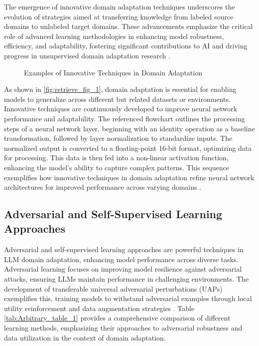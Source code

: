 The emergence of innovative domain adaptation techniques underscores the evolution of strategies aimed at transferring knowledge from labeled source domains to unlabeled target domains. These advancements emphasize the critical role of advanced learning methodologies in enhancing model robustness, efficiency, and adaptability, fostering significant contributions to AI and driving progress in unsupervised domain adaptation research \cite{park2023domainadaptationbasedhuman,zhao2017multiplesourcedomainadaptation}.

\begin{figure}[ht!]
\centering
{}\hspace{0.03\textwidth}
\caption{Examples of Innovative Techniques in Domain Adaptation}\label{fig:retrieve_fig_1}
\end{figure}

As shown in \autoref{fig:retrieve_fig_1}, domain adaptation is essential for enabling models to generalize across different but related datasets or environments. Innovative techniques are continuously developed to improve neural network performance and adaptability. The referenced flowchart outlines the processing steps of a neural network layer, beginning with an identity operation as a baseline transformation, followed by layer normalization to standardize inputs. The normalized output is converted to a floating-point 16-bit format, optimizing data for processing. This data is then fed into a non-linear activation function, enhancing the model's ability to capture complex patterns. This sequence exemplifies how innovative techniques in domain adaptation refine neural network architectures for improved performance across varying domains \cite{ramesh2021zero}.


\subsection{Adversarial and Self-Supervised Learning Approaches} \label{subsec:Adversarial and Self-Supervised Learning Approaches}



Adversarial and self-supervised learning approaches are powerful techniques in LLM domain adaptation, enhancing model performance across diverse tasks. Adversarial learning focuses on improving model resilience against adversarial attacks, ensuring LLMs maintain performance in challenging environments. The development of transferable universal adversarial perturbations (UAPs) exemplifies this, training models to withstand adversarial examples through local utility reinforcement and data augmentation strategies \cite{zhang2024universaladversarialperturbationsvisionlanguage}. Table \ref{tab:Arbitrary_table_1} provides a comprehensive comparison of different learning methods, emphasizing their approaches to adversarial robustness and data utilization in the context of domain adaptation.

